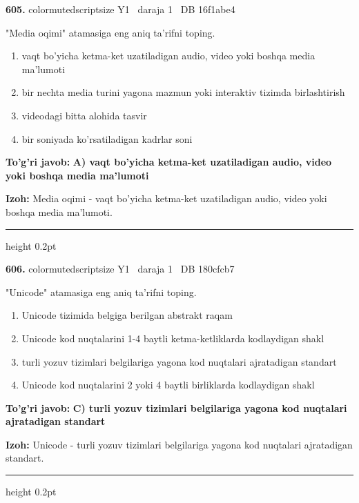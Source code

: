 \documentclass[10pt,a4paper,oneside]{article}
\begin{document}
\noindent\textbf{\color{ink}605.}  {color{muted}scriptsize Y1 \textbullet\ daraja 1 \textbullet\ DB 16f1abe4}
\par
"Media oqimi" atamasiga eng aniq ta'rifni toping.
\begin{enumerate}[label=\Alph*),leftmargin=9mm]
\item vaqt bo'yicha ketma-ket uzatiladigan audio, video yoki boshqa media ma'lumoti
\item bir nechta media turini yagona mazmun yoki interaktiv tizimda birlashtirish
\item videodagi bitta alohida tasvir
\item bir soniyada ko'rsatiladigan kadrlar soni
\end{enumerate}
\begin{tcolorbox}[enhanced,breakable,colback=teal!4,colframe=teal!50!black,boxrule=0.5pt,arc=1.1mm,left=3mm,right=3mm,top=1.7mm,bottom=1.7mm,before skip=2mm,after skip=2mm]
\textbf{\color{teal}To'g'ri javob:} \textbf{A) vaqt bo'yicha ketma-ket uzatiladigan audio, video yoki boshqa media ma'lumoti}
\par\smallskip
\textbf{Izoh:} Media oqimi - vaqt bo'yicha ketma-ket uzatiladigan audio, video yoki boshqa media ma'lumoti.
\end{tcolorbox}
\vspace{2mm}\hrule height 0.2pt \vspace{3mm}

\noindent\textbf{\color{ink}606.}  {color{muted}scriptsize Y1 \textbullet\ daraja 1 \textbullet\ DB 180cfcb7}
\par
"Unicode" atamasiga eng aniq ta'rifni toping.
\begin{enumerate}[label=\Alph*),leftmargin=9mm]
\item Unicode tizimida belgiga berilgan abstrakt raqam
\item Unicode kod nuqtalarini 1-4 baytli ketma-ketliklarda kodlaydigan shakl
\item turli yozuv tizimlari belgilariga yagona kod nuqtalari ajratadigan standart
\item Unicode kod nuqtalarini 2 yoki 4 baytli birliklarda kodlaydigan shakl
\end{enumerate}
\begin{tcolorbox}[enhanced,breakable,colback=teal!4,colframe=teal!50!black,boxrule=0.5pt,arc=1.1mm,left=3mm,right=3mm,top=1.7mm,bottom=1.7mm,before skip=2mm,after skip=2mm]
\textbf{\color{teal}To'g'ri javob:} \textbf{C) turli yozuv tizimlari belgilariga yagona kod nuqtalari ajratadigan standart}
\par\smallskip
\textbf{Izoh:} Unicode - turli yozuv tizimlari belgilariga yagona kod nuqtalari ajratadigan standart.
\end{tcolorbox}
\vspace{2mm}\hrule height 0.2pt \vspace{3mm}
\end{document}
